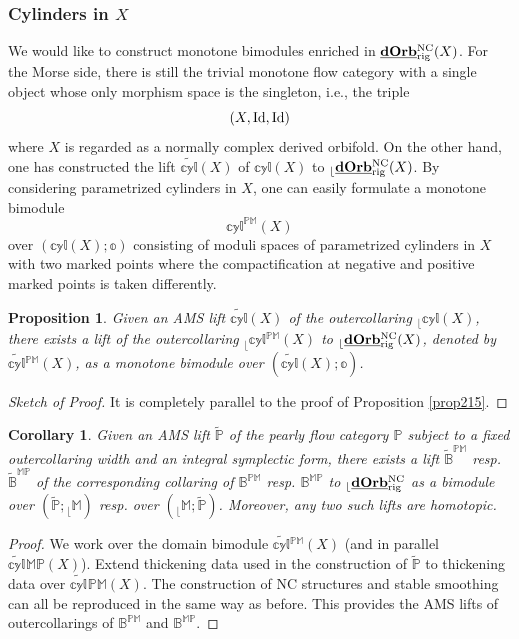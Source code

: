 \documentclass[reqno, 10pt]{amsart}
\numberwithin{equation}{section}
\numberwithin{equation}{section}
\newtheorem{cor}[thm]{Corollary}
\newtheorem{prop}[thm]{Proposition}
\theoremstyle{definition}
\theoremstyle{remark}
\newcommand{\beqn}{\begin{equation*}}
\newcommand{\eeqn}{\end{equation*}}
\newcommand{\mb}{\mathbb}
\renewcommand{\outer}{{}_{\lfloor}}
\newcommand{\wt}{\widetilde}
\newcommand{\uds}[1]{\underline{\smash{#1}}}
\begin{document}
\subsubsection{Cylinders in $X$}

We would like to construct monotone bimodules enriched in  $\uds{\bf dOrb}_{\rm rig}^{\rm NC}(X)$. For the Morse side, there is still the trivial monotone flow category with a single object whose only morphism space is the singleton, i.e., the triple
\beqn
(X, {\rm Id}, {\rm Id})
\eeqn
where $X$ is regarded as a normally complex derived orbifold. On the other hand, one has constructed the lift $\wt{\mb{cyl}}  (X)$ of $\mb{cyl} (X)$ to $\outer \uds{\bf dOrb}^{\rm NC}_{\rm rig}(X)$. By considering parametrized cylinders in $X$, one can easily formulate a monotone bimodule
\beqn
\mb{cyl}^{\mb{PM}}(X)
\eeqn
over $(\mb{cyl}(X); \mb{o})$ consisting of moduli spaces of parametrized cylinders in $X$ with two marked points where the compactification at negative and positive marked points is taken differently.

\begin{prop}\label{prop218}
Given an AMS lift $\widetilde{\mb{cyl}} (X)$ of the outercollaring $\outer \mb{cyl} (X)$, there exists a lift of the outercollaring $\outer \mb{cyl}{}^{\mb{PM}}(X)$ to $\outer \uds{\bf dOrb}^{\rm NC}_{\rm rig}(X)$, denoted by $\widetilde{\mb{cyl}}{}^{\mb{PM}}(X)$, as a monotone bimodule over $(\widetilde{\mb{cyl}} (X); \mb{o})$.
\end{prop}

\begin{proof}[Sketch of Proof] It is completely parallel to the proof of Proposition \ref{prop215}.
\end{proof}

\begin{cor} Given an AMS lift $\tilde {\mb P}$ of the pearly flow category ${\mb P}$ subject to a fixed outercollaring width and an integral symplectic form, there exists a lift $\tilde{\mb B}^{\mb{PM}}$ resp. $\tilde{\mb B}^{\mb{MP}}$ of the corresponding collaring of $\mb{B}^{\mb{PM}}$ resp. $\mb{B}^{\mb{MP}}$ to $\outer \uds{\bf dOrb}_{\rm rig}^{\rm NC}$ as a bimodule over $(\tilde{\mb P}; \outer \mb{M})$ resp. over $(\outer {\mb M}; \tilde {\mb P})$. Moreover, any two such lifts are homotopic. 
\end{cor}

\begin{proof}
We work over the domain bimodule $\wt{\mb{cyl}}{}^{\mb{PM}}(X)$ (and in parallel $\wt{\mb{cyl}}^{}{\mb{MP}}(X)$). Extend thickening data used in the construction of $\tilde{\mb P}$ to thickening data over $\wt{\mb{cyl}}^{}{\mb{PM}}(X)$. The construction of NC structures and stable smoothing can all be reproduced in the same way as before. This provides the AMS lifts of outercollarings of $\mb{B}^{\mb{PM}}$ and $\mb{B}^{\mb{MP}}$. 
\end{proof}
\end{document}
